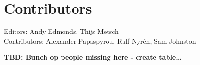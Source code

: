\documentclass[10pt,a4paper]{article}
\begin{document}
\section{Contributors}

Editors: Andy Edmonds, Thijs Metsch \\
Contributors: Alexander Papaspyrou, Ralf Nyrén, Sam Johnston

\textbf{TBD: Bunch op people missing here - create table\ldots}
%
%
%
%
%
%
%
%
%
%
%
%
%
%
%
%
%
\end{document}
